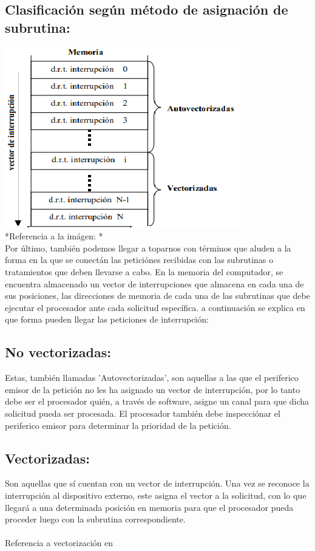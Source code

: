 \documentclass[12pt]{article}
\begin{document}
\begin{multicols}{2}
\section*{Clasificación según método de asignación de subrutina: }
\includegraphics[scale=0.7]{tabla de vectores.PNG}\\
*Referencia a la imágen: \cite{Ruz2}*\\[0.5 cm]
Por último, también podemos llegar a  toparnos con términos que aluden a la forma en la que se conectán las peticiónes recibidas con las subrutinas o tratamientos que deben llevarse a cabo. En la memoria del computador, se encuentra almacenado un vector de interrupciones que almacena en cada una de sus posiciones, las direcciones de memoria de cada una de las subrutinas que debe ejecutar el procesador ante cada solicitud específica. a continuación se explica en que forma pueden llegar las peticiones de interrupción:
\subsection*{No vectorizadas: }
Estas, también llamadas 'Autovectorizadas', son aquellas a las que el periferico emisor de la petición no les ha asignado un vector de interrupción, por lo tanto debe ser el procesador quién, a través de software, asigne un canal para que dicha solicitud pueda ser procesada. El procesador también debe inspecciónar el periferico emisor para determinar la prioridad de la petición.

\subsection*{Vectorizadas: }
Son aquellas que sí cuentan con un vector de interrupción. Una vez se reconoce la interrupción al dispositivo externo, este asigna el vector a la solicitud, con lo que llegará a una determinada posición en memoria para que el procesador pueda proceder luego con la subrutina correspondiente.
\\\\Referencia a vectorización en \cite{Ruz2}


\end{multicols}
\end{document}
